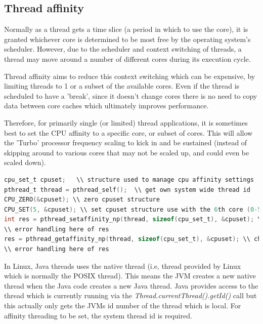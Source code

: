 \documentclass[final_report.tex]{subfiles}
\begin{document}
\subsection{Thread affinity}
Normally as a thread gets a time slice (a period in which to use the core), it is granted whichever core is determined to be most free by the operating system's scheduler. However, due to the scheduler and context switching of threads, a thread may move around a number of different cores during its execution cycle.

Thread affinity aims to reduce this context switching which can be expensive, by limiting threads to 1 or a subset of the available cores. Even if the thread is scheduled to have a 'break', since it doesn't change cores there is no need to copy data between core caches which ultimately improves performance. 

Therefore, for primarily single (or limited) thread applications, it is sometimes best to set the CPU affinity to a specific core, or subset of cores. This will allow the 'Turbo' processor frequency scaling to kick in and be sustained (instead of skipping around to various cores that may not be scaled up, and could even be scaled down).

\begin{lstlisting}[language=C, caption={Example of setting thread affinity}, label=lst:c_affinity]
cpu_set_t cpuset;	\\ structure used to manage cpu affinity settings
pthread_t thread = pthread_self();  \\ get own system wide thread id
CPU_ZERO(&cpuset); \\ zero cpuset structure
CPU_SET(5, &cpuset); \\ set cpuset structure use with the 6th core (0-5)
int res = pthread_setaffinity_np(thread, sizeof(cpu_set_t), &cpuset); \\ set affinity of thread
\\ error handling here of res
res = pthread_getaffinity_np(thread, sizeof(cpu_set_t), &cpuset); \\ check affinity of thread
\\ error handling here of res
\end{lstlisting}

In Linux, Java threads uses the native thread (i.e, thread provided by Linux which is normally the POSIX thread). This means the JVM creates a new native thread when the Java code creates a new Java thread. Java provides access to the thread which is currently running via the \textit{Thread.currentThread().getId()} call but this actually only gets the JVMs id number of the thread which is local. For affinity threading to be set, the system thread id is required.
\end{document}
